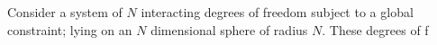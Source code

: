 Consider a system of $N$ interacting degrees of freedom subject to a global constraint; lying on an $N$ dimensional sphere of radius $N$. These degrees of f